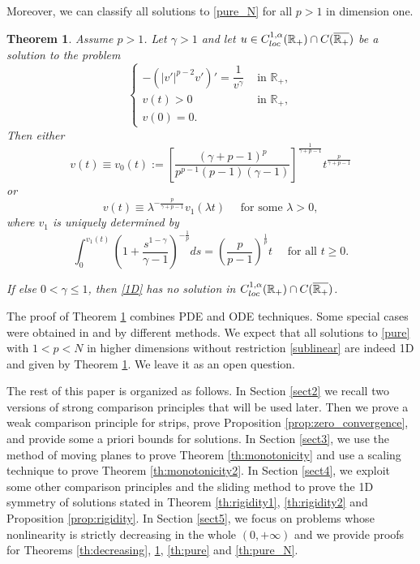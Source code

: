 \documentclass[reqno]{amsart}
\theoremstyle{plain}
\newtheorem{theorem}{Theorem}
\theoremstyle{definition}
\theoremstyle{remark}
\begin{document}
	Moreover, we can classify all solutions to \eqref{pure_N} for all $p>1$ in dimension one.
	\begin{theorem}\label{th:1D}
		Assume $p>1$. Let $\gamma>1$ and let $u \in C^{1,\alpha}_{\rm loc}(\mathbb{R}_+) \cap C(\overline{\mathbb{R}_+})$ be a solution to the problem
		\begin{equation}\label{1D}
			\begin{cases}
				-(|v'|^{p-2} v')' = \dfrac{1}{v^\gamma} & \text{ in } \mathbb{R}_+,\\
				v(t)>0 & \text{ in } \mathbb{R}_+,\\
				v(0)=0.
			\end{cases}
		\end{equation}
		Then either
		\[
		v(t) \equiv v_0(t) := \left[\frac{(\gamma+p-1)^p}{p^{p-1}(p-1)(\gamma-1)}\right]^\frac{1}{\gamma+p-1}	t^\frac{p}{\gamma+p-1}
		\]
		or
		\[
		v(t) \equiv \lambda^{-\frac{p}{\gamma+p-1}} v_1(\lambda t) \quad\text{ for some } \lambda>0,
		\]
		where $v_1$ is uniquely determined by
		\[	
		\int_{0}^{v_1(t)} \left(1 + \frac{s^{1-\gamma}}{\gamma-1}\right)^{-\frac{1}{p}} ds = \left(\frac{p}{p-1}\right)^\frac{1}{p}t \quad\text{ for all } t\ge0.
		\]
		
		If else $0<\gamma\le1$, then \eqref{1D} has no solution in $C^{1,\alpha}_{\rm loc}(\mathbb{R}_+) \cap C(\overline{\mathbb{R}_+})$.
	\end{theorem}	
	The proof of Theorem \ref{th:1D} combines PDE and ODE techniques. Some special cases were obtained in \cite[Proposition 2.4]{MR4044739} and \cite[Theorem 11]{MR4753083} by different methods. We expect that all solutions to \eqref{pure} with $1<p<N$ in higher dimensions without restriction \eqref{sublinear} are indeed 1D and given by Theorem \ref{th:1D}. We leave it as an open question.
	
	The rest of this paper is organized as follows. In Section \ref{sect2} we recall two versions of strong comparison principles that will be used later. Then we prove a weak comparison principle for strips, prove Proposition \ref{prop:zero_convergence}, and provide some a priori bounds for solutions. In Section \ref{sect3}, we use the method of moving planes to prove Theorem \ref{th:monotonicity} and use a scaling technique to prove Theorem \ref{th:monotonicity2}. In Section \ref{sect4}, we exploit some other comparison principles and the sliding method to prove the 1D symmetry of solutions stated in Theorem \ref{th:rigidity1}, \ref{th:rigidity2} and Proposition \ref{prop:rigidity}. In Section \ref{sect5}, we focus on problems whose nonlinearity is strictly decreasing in the whole $(0,+\infty)$ and we provide proofs for Theorems \ref{th:decreasing}, \ref{th:1D}, \ref{th:pure} and \ref{th:pure_N}.
	
\end{document}
